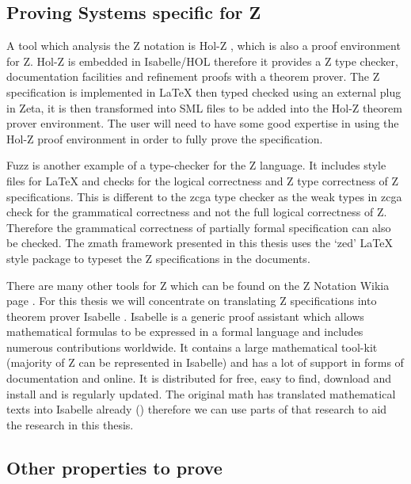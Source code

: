 \subsection{Proving Systems specific for Z}
\label{subsec:provingSystemsForZ}

A tool which analysis the Z notation is Hol-Z \cite{hol-z}, which is also a proof environment for Z. Hol-Z is embedded in Isabelle/HOL therefore it provides a Z type checker, documentation facilities and refinement proofs with a theorem prover. The Z specification is implemented in \LaTeX{} then typed checked using an external plug in Zeta, it is then transformed into SML files to be added into the Hol-Z theorem prover environment. The user will need to have some good expertise in using the Hol-Z proof environment in order to fully prove the specification.

Fuzz \cite{spiveyfuzz} is another example of a type-checker for the Z language. It includes style files for \LaTeX{} and checks for the logical correctness and Z type correctness of Z specifications. This is different to the \gls{zcga} type checker as the weak types in \gls{zcga} check for the grammatical correctness and not the full logical correctness of Z. Therefore the grammatical correctness of partially formal specification can also be checked. The \gls{zmath} framework presented in this thesis uses the `zed' \LaTeX{} style package to typeset the Z specifications in the documents.

There are many other tools for Z which can be found on the Z Notation Wikia page \cite{zwikia}. For this thesis we will concentrate on translating Z specifications into theorem prover Isabelle \cite{isabelle}. Isabelle is a generic proof assistant which allows mathematical formulas to be expressed in a formal language and includes numerous contributions worldwide. It contains a large mathematical tool-kit (majority of Z can be represented in Isabelle) and has a lot of support in forms of documentation and online. It is distributed for free, easy to find, download and install and is regularly updated. The original \gls{math} has translated mathematical texts into Isabelle already (\cite{mathintoisa}) therefore we can use parts of that research to aid the research in this thesis.

\subsection{Other properties to prove}
\label{subsec:propertiestoprove}

